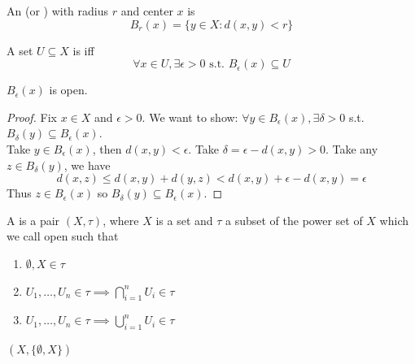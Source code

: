 \documentclass[11pt]{article}
\begin{document}
%



An  (or ) with radius $r$ and center $x$ is
$$B_r(x) = \{y \in X: d(x, y) < r\}$$

A set $U \subseteq X$ is  iff
$$\forall x \in U, \exists \epsilon > 0 \text{ s.t. } B_\epsilon(x) \subseteq U$$

\example $B_\epsilon(x)$ is open.
\begin{proof}
	Fix $x \in X$ and $\epsilon > 0$. We want to show: $\forall y \in B_\epsilon(x), \exists \delta > 0$ s.t. $B_\delta(y) \subseteq B_\epsilon(x)$. \\
	Take $y \in B_\epsilon(x)$, then $d(x,y) < \epsilon$. Take $\delta = \epsilon - d(x,y) > 0$. Take any $z \in B_\delta(y)$, we have
	$$d(x,z) \leq d(x,y) + d(y,z) < d(x,y) + \epsilon - d(x,y) = \epsilon$$
	Thus $z \in B_\epsilon(x)$ so $B_\delta(y) \subseteq B_\epsilon(x)$.
\end{proof}
 A  is a pair $(X, \tau)$, where $X$ is a set and $\tau$ a subset of the power set of $X$ which we call open such that
\begin{enumerate}
	\item $\emptyset, X \in \tau$
	\item $U_1, \hdots, U_n \in \tau \implies \bigcap_{i=1}^n U_i \in \tau$
	\item $U_1, \hdots, U_n \in \tau \implies \bigcup_{i=1}^n U_i \in \tau$
\end{enumerate}

\example
$(X, \{\emptyset, X \})$
\end{document}
